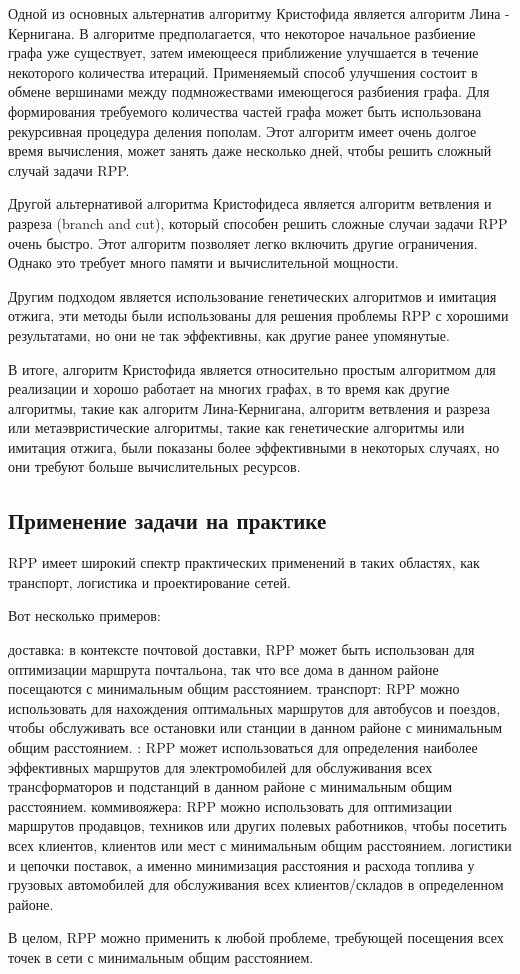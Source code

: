 Одной из основных альтернатив алгоритму Кристофида является алгоритм Лина - Кернигана. В алгоритме предполагается, что некоторое начальное разбиение графа уже существует, затем имеющееся приближение улучшается в течение некоторого количества итераций. Применяемый способ улучшения состоит в обмене вершинами между подмножествами имеющегося разбиения графа. Для формирования требуемого количества частей графа может быть использована рекурсивная процедура деления пополам. Этот алгоритм имеет очень долгое время вычисления, может занять даже несколько дней, чтобы решить сложный случай задачи RPP.

Другой альтернативой алгоритма Кристофидеса является алгоритм ветвления и разреза (branch and cut), который способен решить сложные случаи задачи RPP очень быстро. Этот алгоритм позволяет легко включить другие ограничения. Однако это требует много памяти и вычислительной мощности.

Другим подходом является использование генетических алгоритмов и имитация отжига, эти методы были использованы для решения проблемы RPP с хорошими результатами, но они не так эффективны, как другие ранее упомянутые.

В итоге, алгоритм Кристофида является относительно простым алгоритмом для реализации и хорошо работает на многих графах, в то время как другие алгоритмы, такие как алгоритм Лина-Кернигана, алгоритм ветвления и разреза или метаэвристические алгоритмы, такие как генетические алгоритмы или имитация отжига, были показаны более эффективными в некоторых случаях, но они требуют больше вычислительных ресурсов.

\subsection{Применение задачи на практике}
RPP имеет широкий спектр практических применений в таких областях, как транспорт, логистика и проектирование сетей. 

Вот несколько примеров:
\begin{enumerate}
     доставка: в контексте почтовой доставки, RPP может быть использован для оптимизации маршрута почтальона, так что все дома в данном районе посещаются с минимальным общим расстоянием. 
     транспорт: RPP можно использовать для нахождения оптимальных маршрутов для автобусов и поездов, чтобы обслуживать все остановки или станции в данном районе с минимальным общим расстоянием.
    : RPP может использоваться для определения наиболее эффективных маршрутов для электромобилей для обслуживания всех трансформаторов и подстанций в данном районе с минимальным общим расстоянием.
     коммивояжера: RPP можно использовать для оптимизации маршрутов продавцов, техников или других полевых работников, чтобы посетить всех клиентов, клиентов или мест с минимальным общим расстоянием.
     логистики и цепочки поставок, а именно минимизация расстояния и расхода топлива у грузовых автомобилей для обслуживания всех клиентов/складов в определенном районе.
\end{enumerate}
В целом, RPP можно применить к любой проблеме, требующей посещения всех точек в сети с минимальным общим расстоянием.